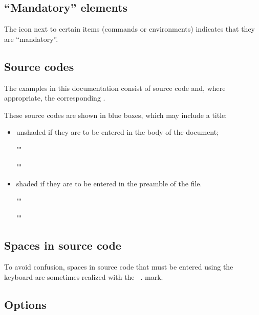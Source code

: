 \documentclass[english,nolocaltoc]{nwejmart}
\newtheorem[style=definition]{fact}
\newtheorem[title-plural=Criteria]{criterion}
\newtheorem[title=random experiment]{rexp}
\begin{document}
\subsection{\enquote{Mandatory} elements}
\label{sec-comm-oblig}

The \mandatory{} icon next to certain items (commands or
environments) indicates that they are \enquote{mandatory}.

\subsection{Source codes}
\label{sec-codes-sources}

The examples in this documentation consist of source code and, where
appropriate, the corresponding .

These source codes are shown in blue boxes, which may include a title:
\begin{itemize}
\item unshaded if they are to be entered in the body of the document;
\begin{bodycode}
""
\end{bodycode}
\begin{bodycode}[title=\meta{title}]
""
\end{bodycode}
\item shaded if they are to be entered in the preamble of the file.
\begin{preamblecode}
""
\end{preamblecode}
\begin{preamblecode}[title=\meta{title}]
""
\end{preamblecode}
\end{itemize}

\subsection{Spaces in source code}
\label{sec-espaces-dans-les}

To avoid confusion, spaces in source code that must be entered using
the keyboard are sometimes realized with the \lstinline[showspaces]+ +. mark.

\subsection{Options}
\label{sec-options}
\end{document}
